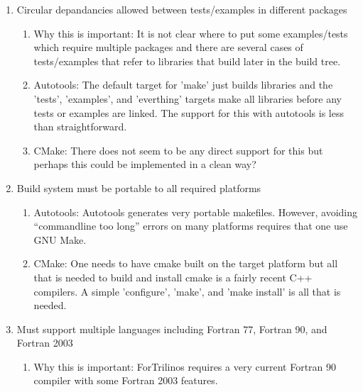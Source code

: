 \documentclass[pdf,ps2pdf,11pt]{SANDreport}
\begin{document}
\begin{enumerate}
\begin{enumerate}
\begin{enumerate}
    \end{enumerate}

  {}\item Circular depandancies allowed between tests/examples in
  different packages

    \begin{enumerate}

    {}\item Why this is important: It is not clear where to put some
    examples/tests which require multiple packages and there are
    several cases of tests/examples that refer to libraries that build
    later in the build tree.

    {}\item Autotools: The default target for 'make' just builds
    libraries and the 'tests', 'examples', and 'everthing' targets
    make all libraries before any tests or examples are linked.  The
    support for this with autotools is less than straightforward.

    {}\item CMake: There does not seem to be any direct support for
    this but perhaps this could be implemented in a clean way?

    \end{enumerate}

  {}\item Build system must be portable to all required platforms

    \begin{enumerate}

    {}\item Autotools: Autotools generates very portable makefiles.
    However, avoiding ``commandline too long'' errors on many
    platforms requires that one use GNU Make.

    {}\item CMake: One needs to have cmake built on the target
    platform but all that is needed to build and install cmake is a
    fairly recent C++ compilers.  A simple 'configure', 'make', and
    'make install' is all that is needed.

    \end{enumerate}

  {}\item Must support multiple languages including Fortran 77,
  Fortran 90, and Fortran 2003

    \begin{enumerate}

    {}\item Why this is important: ForTrilinos requires a very current
    Fortran 90 compiler with some Fortran 2003 features.


\end{enumerate}
\end{enumerate}
\end{enumerate}
\end{document}
